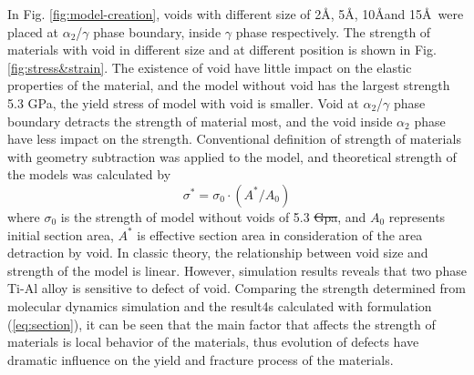 \documentclass[materials,article,submit,moreauthors,pdftex,10pt,a4paper]{Definitions/mdpi}
\providecommand{\DIFadd}[1]{{\protect\color{blue}\uwave{#1}}} %
\providecommand{\DIFdel}[1]{{\protect\color{red}\sout{#1}}}                      %
\providecommand{\DIFaddbegin}{} %
\providecommand{\DIFaddend}{} %
\providecommand{\DIFdelbegin}{} %
\providecommand{\DIFdelend}{} %
\begin{document}
In Fig. \ref{fig:model-creation}, voids with different size of 2\AA, 5\AA, 10\AA and 15\AA\ were placed  at $\alpha_2$/$\gamma$ phase boundary, inside $\gamma$ phase respectively. The strength of materials with void in different size and at different position is shown in Fig.\ref{fig:stress&strain}. The existence of void have little impact on the elastic properties of the material, and the model without void has the largest strength 5.3 GPa, the yield stress of model with void is smaller. Void at $\alpha_2$/$\gamma$ phase boundary  detracts the strength of  material most, and the void inside $\alpha_2$ phase  have less impact on the strength.          
Conventional definition of strength of materials with geometry subtraction was applied to the model, and theoretical strength of the models was calculated by
\begin{equation} \label{eq:section} 
\sigma^* = \sigma_0 \cdot({A^*}/{A_0})
\end{equation}
where $\sigma_0$ is the strength of model without voids of 5.3 \DIFdelbegin \DIFdel{Gpa}\DIFdelend \DIFaddbegin \DIFadd{GPa}\DIFaddend , and $A_0$ represents initial section area,  $A^*$ is effective section area in consideration of the area detraction by void.  In classic theory, the relationship between void size and strength of the model is linear. However, simulation results reveals that two phase Ti-Al alloy is sensitive to defect of void.  Comparing the strength determined from molecular dynamics simulation and the result4s calculated with formulation (\ref{eq:section}), it can be seen that the main factor that affects the strength of materials is local behavior of the materials, thus evolution of defects have dramatic influence on the yield and fracture process of the materials.
\end{document}
